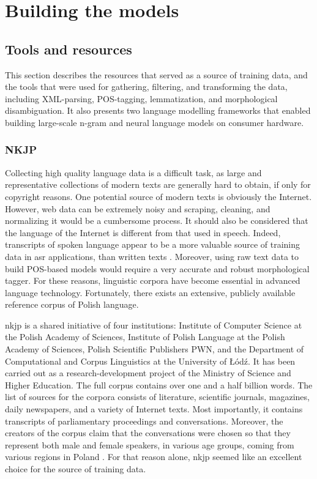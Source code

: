 \chapter{Building the models}
\label{chapter:tools}
\section{Tools and resources}
This section describes the resources that served as a source of training data, and the tools that were used for gathering, filtering, and transforming the data, including XML-parsing, POS-tagging, lemmatization, and morphological disambiguation. It also presents two language modelling frameworks that enabled building large-scale n-gram and neural language models on consumer hardware.
\subsection{NKJP}
\label{section:nkjp}
Collecting high quality language data is a difficult task, as large and representative collections of modern texts are generally hard to obtain, if only for copyright reasons. One potential source of modern texts is obviously the Internet. However, web data can be extremely noisy and scraping, cleaning, and normalizing it would be a cumbersome process. It should also be considered that the language of the Internet is different from that used in speech. Indeed, transcripts of spoken language appear to be a more valuable source of training data in \gls{asr} applications, than written texts \cite{dziadzio2015comparison}. Moreover, using raw text data to build POS-based models would require a very accurate and robust morphological tagger. For these reasons, linguistic corpora have become essential in advanced language technology. Fortunately, there exists an extensive, publicly available reference corpus of Polish language.

\gls{nkjp} is a shared initiative of four institutions: Institute of Computer Science at the Polish Academy of Sciences, Institute of Polish Language at the Polish Academy of Sciences, Polish Scientific Publishers PWN, and the Department of Computational and Corpus Linguistics at the University of Łódź. It has been carried out as a research-development project of the Ministry of Science and Higher Education. The full corpus contains over one and a half billion words. The list of sources for the corpora consists of literature, scientific journals, magazines, daily newspapers, and a variety of Internet texts. Most importantly, it contains transcripts of parliamentary proceedings and conversations. Moreover, the creators of the corpus claim that the conversations were chosen so that they represent both male and female speakers, in various age groups, coming from various regions in Poland \cite{lewandowska2012narodowy}. For that reason alone, \gls{nkjp} seemed like an excellent choice for the source of training data.

